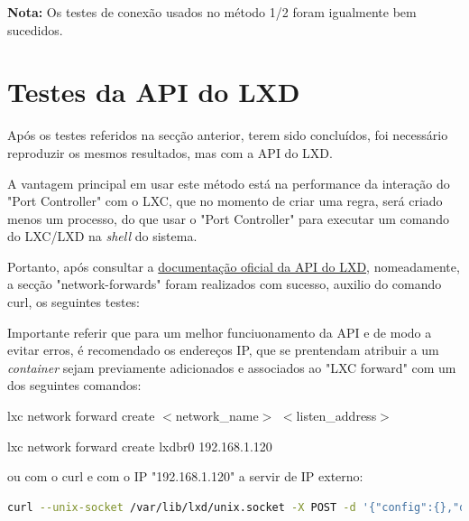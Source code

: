 \textbf{Nota:} Os testes de conexão usados no método 1/2 foram igualmente bem sucedidos.







\section{Testes da API do LXD}


Após os testes referidos na secção anterior, terem sido concluídos, foi necessário
reproduzir os mesmos resultados, mas com a API do LXD.

A vantagem principal em usar este método está na performance da interação do "Port Controller" com
o LXC, que no momento de criar uma regra, será criado menos um processo, do que 
usar o "Port Controller" para executar um comando do LXC/LXD na \textit{shell} do sistema.

Portanto, após consultar a \href{https://documentation.ubuntu.com/lxd/en/latest/api/#/}{documentação oficial da API do LXD},
nomeadamente, a secção "network-forwards" foram realizados com sucesso, auxilio do comando curl, os seguintes testes:


Importante referir que para um melhor funciuonamento da API e de modo a evitar erros,
é recomendado os endereços IP, que se prentendam atribuir a um \textit{container} 
sejam previamente adicionados e associados ao "LXC forward" com um dos seguintes comandos:

\begin{tcolorbox}[colback=blue!5!white,colframe=blue!75!black]
    lxc network forward create $<$network\_name$>$ $<$listen\_address$>$
\end{tcolorbox}

\begin{tcolorbox}[colback=blue!5!white,colframe=blue!75!black]
    lxc network forward create lxdbr0 192.168.1.120
\end{tcolorbox}


ou com o curl e com o IP "192.168.1.120" a servir de IP externo:


\begin{lstlisting}[language=Bash, caption={Exemplo para registar um IP para redirecionar trafego (API do LXD)}]
    curl --unix-socket /var/lib/lxd/unix.socket -X POST -d '{"config":{},"description":"","listen_address":"192.168.1.120","ports":[]}'  lxd/1.0/networks/lxdbr0/forwards
\end{lstlisting}


